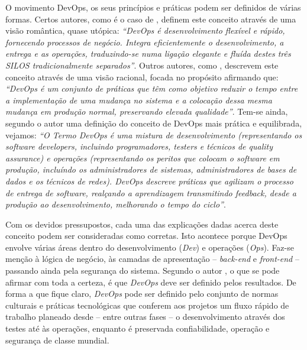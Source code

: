 \hspace{1cm}O movimento DevOps, os seus princípios e práticas podem ser definidos de várias formas. Certos autores, como é o caso de , definem este conceito através de uma visão romântica, quase utópica: \textit{``DevOps é desenvolvimento flexível e rápido, fornecendo processos de negócio. Integra eficientemente o desenvolvimento, a entrega e as operações, traduzindo-se numa ligação elegante e fluída destes três SILOS tradicionalmente separados''}. Outros autores, como , descrevem este conceito através de uma visão racional, focada no propósito afirmando que: \textit{``DevOps é um conjunto de práticas que têm como objetivo reduzir o tempo entre a implementação de uma mudança no sistema e a colocação dessa mesma mudança em produção normal, preservando elevada qualidade''}. Tem-se ainda, segundo o autor  uma definição do conceito de DevOps mais prática e equilibrada, vejamos: \textit{``O Termo DevOps é uma mistura de desenvolvimento (representando os software developers, incluindo programadores, testers e técnicos de quality assurance) e operações (representando os peritos que colocam o software em produção, incluíndo os administradores de sistemas, administradores de bases de dados e os técnicos de redes). DevOps descreve práticas que agilizam o processo de entrega de software, realçando a aprendizagem transmitindo feedback, desde a produção ao desenvolvimento, melhorando o tempo do ciclo''}.

\hspace{1cm}Com os devidos pressupostos, cada uma das explicações dadas acerca deste conceito podem ser consideradas como corretas. Isto acontece porque DevOps envolve várias áreas dentro do desenvolvimento (\textit{Dev}) e operações (\textit{Ops}). Faz-se menção à lógica de negócio, às camadas de apresentação -- \textit{back-end} e \textit{front-end} -- passando ainda pela segurança do sistema.  Segundo o autor , o que se pode afirmar com toda a certeza, é que \textit{DevOps} deve ser definido pelos resultados. De forma a que fique claro, \textit{DevOps} pode ser definido pelo conjunto de normas culturais e práticas tecnológicas que conferem aos projetos um fluxo rápido de trabalho planeado desde -- entre outras fases -- o desenvolvimento através dos testes até às operações, enquanto é preservada confiabilidade, operação e segurança de classe mundial.\\

